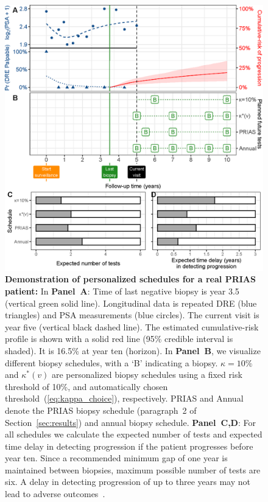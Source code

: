 \begin{figure}
\centerline{\includegraphics{images/demo_schedule.eps}}
\caption{\textbf{Demonstration of personalized schedules for a real PRIAS patient:} In \textbf{Panel~A}: Time of last negative biopsy is year 3.5 (vertical green solid line). Longitudinal data is repeated DRE (blue triangles) and PSA measurements (blue circles). The current visit is year five (vertical black dashed line). The estimated cumulative-risk profile is shown with a solid red line (95\% credible interval is shaded). It is 16.5\% at year ten (horizon). In \textbf{Panel~B}, we visualize different biopsy schedules, with a `B' indicating a biopsy. \textbf{$\kappa=10\%$} and \textbf{$\kappa^*(v)$} are personalized biopsy schedules using a fixed risk threshold of 10\%, and automatically chosen threshold~(\ref{eq:kappa_choice}), respectively. PRIAS and Annual denote the PRIAS biopsy schedule (paragraph~2 of Section~\ref{sec:results}) and annual biopsy schedule. \textbf{Panel~C,D}: For all schedules we calculate the expected number of tests and expected time delay in detecting progression if the patient progresses before year ten. Since a recommended minimum gap of one year is maintained between biopsies, maximum possible number of tests are six.  A delay in detecting progression of up to three years may not lead to adverse outcomes~\citep{carvalho}. }\label{fig:demo_schedule}
\end{figure}